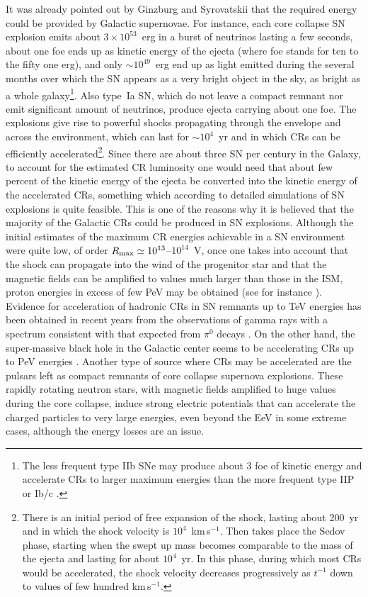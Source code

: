 \documentclass[twoside,12pt]{article}
\begin{document}
It was already pointed out by Ginzburg and Syrovatskii \cite{gi64} that the required energy could be provided by Galactic supernovae. For instance, each core collapse SN explosion emits about $3\times 10^{53}$~erg in a burst of neutrinos lasting a  few seconds, about  one foe ends up  as kinetic energy of the ejecta (where foe stands for ten to the fifty one erg), and only $\sim 10^{49}$~erg  end up as light emitted during the several months over which the SN appears as a very bright object in the sky, as bright as a whole galaxy\footnote{The less frequent type IIb SNe may produce about 3 foe of kinetic energy and accelerate CRs to larger maximum energies than the more frequent type IIP or Ib/c \cite{pt10}.}. Also  type~Ia SN, which do not leave a compact remnant nor emit significant amount of neutrinos, produce ejecta carrying  about one foe. The explosions give rise to powerful shocks propagating through the envelope and across the environment, which can last for $\sim 10^4$~yr and in which CRs can be efficiently accelerated\footnote{There is an initial period of free expansion of the shock, lasting about 200~yr and in which the shock velocity is $10^4$~km\,s$^{-1}$. Then takes place the Sedov phase, starting when the swept up mass becomes comparable to the mass of the ejecta and lasting for about $10^4$~yr. In this phase, during  which most CRs would be accelerated, the shock velocity decreases progressively as $t^{-1}$ down to values of  few hundred km\,s$^{-1}$.}. Since there are about three SN per century in the Galaxy, to account for the estimated CR luminosity one would need that about few percent of the kinetic energy of the ejecta be converted  into the kinetic energy of the accelerated  CRs, something which according to detailed simulations of SN explosions is quite feasible. This is one of the reasons why it is believed that the majority of the Galactic CRs could be produced in SN explosions. Although the initial estimates of the maximum CR energies achievable in  a SN environment were quite low, of order $R_{\rm max}\simeq 10^{13}$--$10^{14}$~V, once one takes into account that the shock can propagate into the wind of the progenitor star and  that the magnetic fields can be amplified to values much larger than those in the ISM, proton energies in excess of few PeV may be obtained (see for instance \cite{pt10}).  Evidence for acceleration of hadronic CRs in SN remnants up to TeV energies has been obtained in recent years from the observations of gamma rays with a spectrum consistent with that expected from $\pi^0$ decays \cite{snr}.
On the other hand,  the super-massive black hole in the Galactic center seems to be accelerating CRs up to PeV energies \cite{pevatron}. Another type of source where CRs may be accelerated  are the pulsars left as compact remnants of core collapse supernova explosions. These rapidly rotating neutron stars, with magnetic fields amplified to huge values during the core collapse, induce strong electric potentials that can accelerate the charged particles to very large energies, even beyond the EeV in some extreme cases, although the energy losses are an issue.
\end{document}
